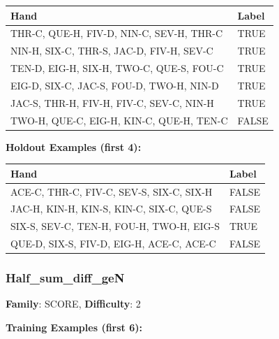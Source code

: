 \documentclass[10pt,a4paper]{article}
\begin{document}
\begin{small}
\begin{tabular}{p{8cm}l}
\toprule
Hand & Label \\
\midrule
THR-C, QUE-H, FIV-D, NIN-C, SEV-H, THR-C & \textcolor{positive}{TRUE} \\
NIN-H, SIX-C, THR-S, JAC-D, FIV-H, SEV-C & \textcolor{positive}{TRUE} \\
TEN-D, EIG-H, SIX-H, TWO-C, QUE-S, FOU-C & \textcolor{positive}{TRUE} \\
EIG-D, SIX-C, JAC-S, FOU-D, TWO-H, NIN-D & \textcolor{positive}{TRUE} \\
JAC-S, THR-H, FIV-H, FIV-C, SEV-C, NIN-H & \textcolor{positive}{TRUE} \\
TWO-H, QUE-C, EIG-H, KIN-C, QUE-H, TEN-C & \textcolor{negative}{FALSE} \\
\bottomrule
\end{tabular}
\end{small}

\textbf{Holdout Examples (first 4):}

\begin{small}
\begin{tabular}{p{8cm}l}
\toprule
Hand & Label \\
\midrule
ACE-C, THR-C, FIV-C, SEV-S, SIX-C, SIX-H & \textcolor{negative}{FALSE} \\
JAC-H, KIN-H, KIN-S, KIN-C, SIX-C, QUE-S & \textcolor{negative}{FALSE} \\
SIX-S, SEV-C, TEN-H, FOU-H, TWO-H, EIG-S & \textcolor{positive}{TRUE} \\
QUE-D, SIX-S, FIV-D, EIG-H, ACE-C, ACE-C & \textcolor{negative}{FALSE} \\
\bottomrule
\end{tabular}
\end{small}

\vspace{0.5cm}

\subsubsection{Half\_sum\_diff\_geN}

\textbf{Family}: SCORE, \textbf{Difficulty}: 2

\textbf{Training Examples (first 6):}
\end{document}
